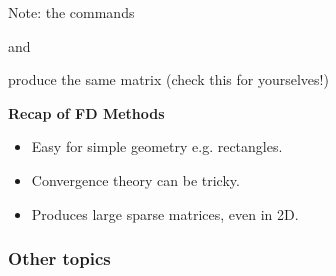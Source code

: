 \documentclass[12pt, a4paper]{article}
\theoremstyle{definition}
\theoremstyle{remark}
\numberwithin{equation}{section}
\begin{document}
  Note: the commands 
  
    and
  
   
   produce the same matrix  (check this for yourselves!)
 
 \vspace{5mm}  
   {\bf Recap of FD Methods}
   \begin{itemize}
\item Easy for simple geometry e.g. rectangles.
\item Convergence theory can be tricky.
\item Produces large sparse matrices, even in 2D.
\end{itemize}

 
 \newpage
\subsubsection{Other topics}
\end{document}
